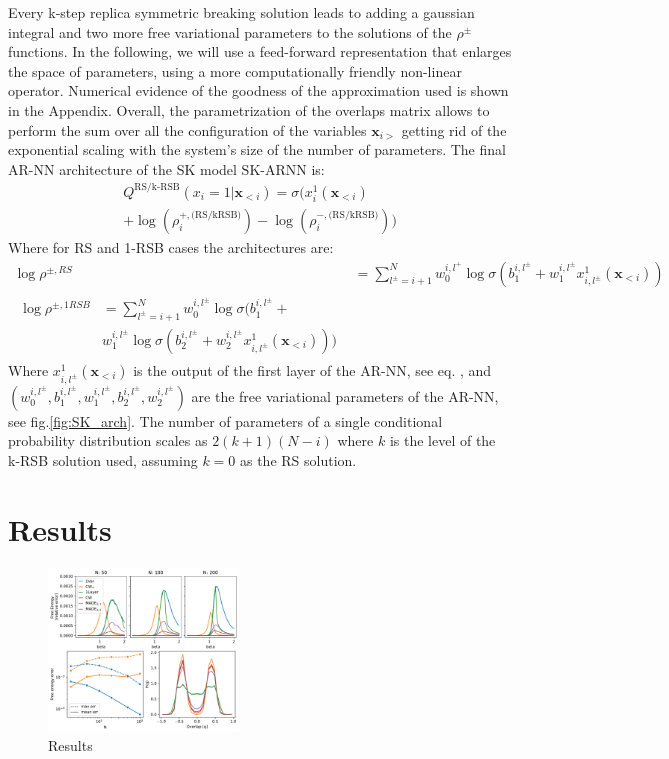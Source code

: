 \documentclass[aps,physrev,10pt,floatfix,reprint]{revtex4-2}
\begin{document}
Every k-step replica symmetric breaking solution leads to adding a gaussian integral and two more free variational parameters to the solutions of the $\rho^{\pm}$ functions. 
In the following, we will use a feed-forward representation that enlarges the space of parameters, using a more computationally friendly non-linear operator. 
Numerical evidence of the goodness of the approximation used is shown in the Appendix. 
Overall, the parametrization of the overlaps matrix allows to perform the sum over all the configuration of the variables $\mathbf{x}_{i>}$ getting rid of the exponential scaling with the system's size of the number of parameters. 
The final AR-NN architecture of the SK model $\text{SK-ARNN}$ is: 
\begin{multline}
    Q^{\text{RS/k-RSB}}\left(x_{i}=1|\mathbf{x}_{<i}\right) = \sigma\bigg( 
        x_i^1(\mathbf{x}_{<i}) \\
        +\log(\rho_i^{+, \text{(RS/kRSB)}}) -
         \log(\rho_i^{-, \text{(RS/kRSB)}})
    \bigg)  
\end{multline}
Where for RS and 1-RSB cases the architectures are:
\begin{align*}
    \log \rho^{\pm, RS} & = \sum_{l^{\pm}=i+1}^{N}  w_0^{i,l^+} \log \sigma(b_1^{i,l^{\pm}} +
w_1^{i,l^{\pm}} x_{i,l^{\pm}}^1(\mathbf{x}_{<i})) \\
\begin{split}
    \log \rho^{\pm, 1RSB} & = 
    \sum_{l^{\pm}=i+1}^{N}  w_0^{i,l^{\pm}} \log\sigma(b_1^{i,l^{\pm}} + \\
    &  w_1^{i,l^{\pm}} \log\sigma(b_2^{i,l^{\pm}} +  w_2^{i,l^{\pm}}  x_{i,l^{\pm}}^1(\mathbf{x}_{<i}))) 
    \end{split}
\end{align*}
Where $x_{i,l^{\pm}}^1(\mathbf{x}_{<i})$ is the output of the first layer of the AR-NN, see eq. , and $(w_0^{i,l^{\pm}}, b_1^{i,l^{\pm}}, w_1^{i,l^{\pm}}, b_2^{i,l^{\pm}}, w_2^{i,l^{\pm}})$ are the free variational parameters of the AR-NN, see fig.\ref{fig:SK_arch}. The number of parameters of a single conditional probability distribution scales as $2(k+1)(N-i)$ where $k$ is the level of the k-RSB solution used, assuming $k=0$ as the RS solution.

\section{Results}

\begin{figure}[!h]
    \centering
    \includegraphics[width=0.45\textwidth]{img/CW_res.pdf}
    \caption{Results}
    \label{fig:curie_weiss}
\end{figure}
\end{document}
